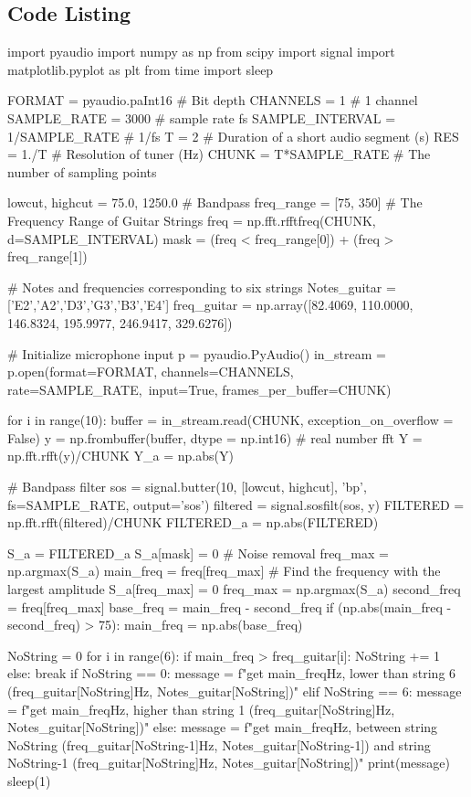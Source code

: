 \documentclass{article}
\begin{document}
\begin{appendices}
\section{Code Listing}
\begin{python}
import pyaudio
import numpy as np 
from scipy import signal
import matplotlib.pyplot as plt
from time import sleep

FORMAT = pyaudio.paInt16 # Bit depth
CHANNELS = 1 # 1 channel
SAMPLE_RATE = 3000  # sample rate fs
SAMPLE_INTERVAL = 1/SAMPLE_RATE # 1/fs
T = 2 # Duration of a short audio segment (s)
RES = 1./T # Resolution of tuner (Hz)
CHUNK = T*SAMPLE_RATE # The number of sampling points

lowcut, highcut = 75.0, 1250.0 # Bandpass
freq_range = [75, 350] # The Frequency Range of Guitar Strings
freq = np.fft.rfftfreq(CHUNK, d=SAMPLE_INTERVAL) 
mask = (freq < freq_range[0]) + (freq > freq_range[1])

# Notes and frequencies corresponding to six strings
Notes_guitar = ['E2','A2','D3','G3','B3','E4']
freq_guitar = np.array([82.4069, 110.0000, 146.8324,
                        195.9977, 246.9417, 329.6276])

# Initialize microphone input
p = pyaudio.PyAudio()
in_stream = p.open(format=FORMAT, channels=CHANNELS, rate=SAMPLE_RATE,\
                input=True, frames_per_buffer=CHUNK)

for i in range(10):  
    buffer = in_stream.read(CHUNK, exception_on_overflow = False)
    y = np.frombuffer(buffer, dtype = np.int16)
    # real number fft
    Y = np.fft.rfft(y)/CHUNK
    Y_a = np.abs(Y)

    # Bandpass filter
    sos = signal.butter(10, [lowcut, highcut], 'bp', fs=SAMPLE_RATE, output='sos')
    filtered = signal.sosfilt(sos, y)
    FILTERED = np.fft.rfft(filtered)/CHUNK
    FILTERED_a = np.abs(FILTERED)
    
    S_a = FILTERED_a
    S_a[mask] = 0 # Noise removal
    freq_max = np.argmax(S_a)
    main_freq = freq[freq_max] # Find the frequency with the largest amplitude
    S_a[freq_max] = 0
    freq_max = np.argmax(S_a)
    second_freq = freq[freq_max]
    base_freq = main_freq - second_freq
    if (np.abs(main_freq - second_freq) > 75):
        main_freq = np.abs(base_freq)

    NoString = 0
    for i in range(6):
        if main_freq > freq_guitar[i]:
            NoString += 1
        else:
            break
    if NoString == 0:
        message = f"get {main_freq}Hz, lower than string 6 ({freq_guitar[NoString]}Hz, {Notes_guitar[NoString]})"
    elif NoString == 6:
        message = f"get {main_freq}Hz, higher than string 1 ({freq_guitar[NoString]}Hz, {Notes_guitar[NoString]})"
    else:
        message = f"get {main_freq}Hz, between string {NoString} ({freq_guitar[NoString-1]}Hz, {Notes_guitar[NoString-1]}) and string {NoString-1} ({freq_guitar[NoString]}Hz, {Notes_guitar[NoString]})"
    print(message)
    sleep(1)
\end{python}
\end{appendices}
\end{document}
